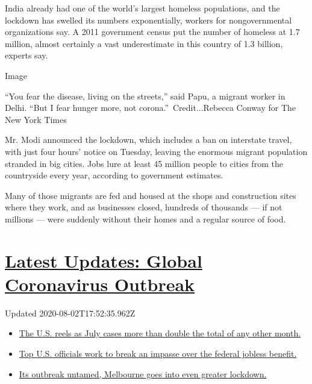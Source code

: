 India already had one of the world's largest homeless populations, and
the lockdown has swelled its numbers exponentially, workers for
nongovernmental organizations say. A 2011 government census put the
number of homeless at 1.7 million, almost certainly a vast underestimate
in this country of 1.3 billion, experts say.

Image

``You fear the disease, living on the streets,'' said Papu, a migrant
worker in Delhi. ``But I fear hunger more, not
corona.''~Credit...Rebecca Conway for The New York Times

Mr. Modi announced the lockdown, which includes a ban on interstate
travel, with just four hours' notice on Tuesday, leaving the enormous
migrant population stranded in big cities. Jobs lure at least 45 million
people to cities from the countryside every year, according to
government estimates.

Many of those migrants are fed and housed at the shops and construction
sites where they work, and as businesses closed, hundreds of thousands
--- if not millions --- were suddenly without their homes and a regular
source of food.

\hypertarget{latest-updates-global-coronavirus-outbreak}{%
\section{\texorpdfstring{\href{https://www.nytimes.com/2020/08/01/world/coronavirus-covid-19.html?action=click\&pgtype=Article\&state=default\&region=MAIN_CONTENT_1\&context=storylines_live_updates}{Latest
Updates: Global Coronavirus
Outbreak}}{Latest Updates: Global Coronavirus Outbreak}}\label{latest-updates-global-coronavirus-outbreak}}

Updated 2020-08-02T17:52:35.962Z

\begin{itemize}
\tightlist
\item
  \href{https://www.nytimes.com/2020/08/01/world/coronavirus-covid-19.html?action=click\&pgtype=Article\&state=default\&region=MAIN_CONTENT_1\&context=storylines_live_updates\#link-34047410}{The
  U.S. reels as July cases more than double the total of any other
  month.}
\item
  \href{https://www.nytimes.com/2020/08/01/world/coronavirus-covid-19.html?action=click\&pgtype=Article\&state=default\&region=MAIN_CONTENT_1\&context=storylines_live_updates\#link-780ec966}{Top
  U.S. officials work to break an impasse over the federal jobless
  benefit.}
\item
  \href{https://www.nytimes.com/2020/08/01/world/coronavirus-covid-19.html?action=click\&pgtype=Article\&state=default\&region=MAIN_CONTENT_1\&context=storylines_live_updates\#link-2bc8948}{Its
  outbreak untamed, Melbourne goes into even greater lockdown.}
\end{itemize}

